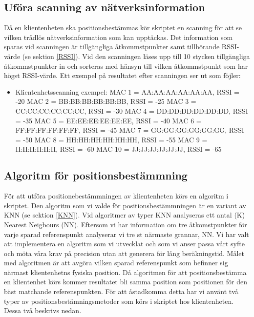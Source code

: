 \documentclass[swedish, a4paper,12pt]{article}
\begin{document}
\subsection{Uföra scanning av nätverksinformation} \label{scanning}
Då en klientenheten ska positionsbestämmas kör skriptet en scanning för att se vilken trådlös nätverksinformation som kan upptäckas. Det information som sparas vid scanningen är tillgängliga åtkommstpunkter samt tillhörande RSSI-värde (se sektion \ref{RSSI}). Vid den scanningen läses upp till 10 stycken tillgängliga åtkommstpunkter in och sorteras med hänsyn till vilken åtkommstpunkt som har högst RSSI-värde. Ett exempel på resultatet efter scanningen ser ut som föjler:

  \begin{itemize}
  \item Klientenhetsscanning exempel:
        \newline MAC 1 = AA:AA:AA:AA:AA:AA,  RSSI = -20
        \newline MAC 2 = BB:BB:BB:BB:BB:BB,  RSSI = -25
        \newline MAC 3 = CC:CC:CC:CC:CC:CC,  RSSI = -30
        \newline MAC 4 = DD:DD:DD:DD:DD:DD,  RSSI = -35
        \newline MAC 5 = EE:EE:EE:EE:EE:EE,  RSSI = -40
        \newline MAC 6 = FF:FF:FF:FF:FF:FF,  RSSI = -45
        \newline MAC 7 = GG:GG:GG:GG:GG:GG,  RSSI = -50
        \newline MAC 8 = HH:HH:HH:HH:HH:HH,  RSSI = -55
        \newline MAC 9 = II:II:II:II:II:II,  RSSI = -60
        \newline MAC 10 = JJ:JJ:JJ:JJ:JJ:JJ,  RSSI = -65
  \end{itemize}

\subsection{Algoritm för positionsbestämmning}
För att utföra positionebestämmningen av klientenheten körs en algoritm i skriptet.
Den algoritm som vi valde för positionsbestämmningen är en variant av KNN (se sektion \ref{KNN}). Vid algoritmer av typer KNN analyseras ett antal (K) Nearest Neigbours (NN). Eftersom vi har information om tre åtkomstpunkter för varje sparad referenspunkt analyserar vi tre st närmaste grannar, NN. Vi har valt att implementera en algoritm som vi utvecklat och som vi anser passa vårt syfte och möta våra krav på precision utan att generera för lång beräkningstid.
Målet med algoritmen är att avgöra vilken sparad referenspunkt som befinner sig närmast klientenhetns fysiska position. Då algoritmen för att positionsbestämma en klientenhet körs kommer resultatet bli samma position som positionen för den bäst matchande referenspunkten.
För att åstadkomma detta har vi använt två typer av positionsbestämningsmetoder som körs i skriptet hos klientenheten. Dessa två beskrivs nedan.
\end{document}
